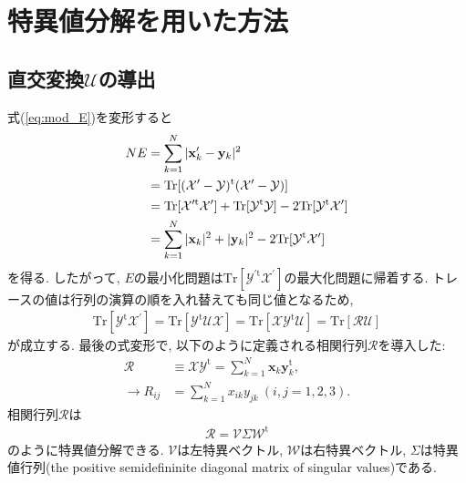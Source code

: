 \clearpage
\section{特異値分解を用いた方法\cite{2004Coutsias}}
\subsection{直交変換$\mathcal{U}$の導出}
式(\ref{eq:mod_E})を変形すると
\begin{align}
 NE
&=
   \sum_{k=1}^{N} |\mathbf{x}_{k}^{\prime} -  \mathbf{y}_{k}|^{2}
 \notag
 \\
&=
   \mathrm{Tr}[ (\mathcal{X}^{\prime} - \mathcal{Y})^{\mathrm{t}} 
                (\mathcal{X}^{\prime} - \mathcal{Y}) ]
 \notag
 \\
&=
     \mathrm{Tr} [ \mathcal{X}^{\prime \mathrm{t}} \mathcal{X}^{\prime} ]
  +  \mathrm{Tr} [ \mathcal{Y}^{\mathrm{t}} \mathcal{Y}]
  - 2\mathrm{Tr} [ \mathcal{Y}^{\mathrm{t}} \mathcal{X}^{\prime} ]
 \notag
 \\
&=
    \sum_{k=1}^{N} |\mathbf{x}_{k}|^{2} + |\mathbf{y}_{k}|^{2} 
  - 2\mathrm{Tr} [\mathcal{Y}^{\mathrm{t}} \mathcal{X}^{\prime} ]
 \notag
  \label{Eq:Residue-SVD}
\end{align}
を得る. 
したがって, $E$の最小化問題は$\mathrm{Tr}[\mathcal{Y}^{\prime \mathrm{t}} \mathcal{X}^{\prime}]$の最大化問題に帰着する. トレースの値は行列の演算の順を入れ替えても同じ値となるため,
\begin{align}
  \mathrm{Tr} [ \mathcal{Y}^{\mathrm{t}} \mathcal{X}^{\prime} ]
=
  \mathrm{Tr} [ \mathcal{Y}^{\mathrm{t}} \mathcal{U} \mathcal{X} ]
=
  \mathrm{Tr} [ \mathcal{X} \mathcal{Y}^{\mathrm{t}} \mathcal{U} ]
=
  \mathrm{Tr} [ \mathcal{R} \mathcal{U} ]
\end{align}
が成立する. 
最後の式変形で, 以下のように定義される相関行列$\mathcal{R}$を導入した: 
\begin{align}
  \mathcal{R}
 &\equiv
  \mathcal{X} \mathcal{Y}^{\mathrm{t}}
  =
  \sum_{k=1}^{N} \mathbf{x}_{k} \mathbf{y}_{k}^{\mathrm{t}},
  \\ 
  \to
  R_{ij} 
 &= \sum_{k=1}^{N} x_{ik} y_{jk} ~ (i, j = 1, 2, 3).
 \end{align}
相関行列$\mathcal{R}$は
\begin{align}
 \mathcal{R} = \mathcal{V} \Sigma \mathcal{W}^{\mathrm{t}}
\end{align}
のように特異値分解できる. $\mathcal{V}$は左特異ベクトル, $\mathcal{W}$は右特異ベクトル, $\Sigma$は特異値行列(the positive semidefininite diagonal matrix of singular values)である.
